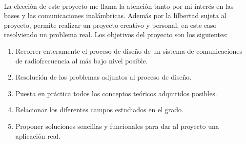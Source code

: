 %
\paragraph{}
La elección de este proyecto me llama la atención tanto por mi interés en las bases y las comunicaciones inalámbricas. 
Además por la lilbertad sujeta al proyecto, permite realizar un proyecto creativo y personal, en este caso resolviendo un problema real.
Los objetivos del proyecto son los siguientes:
\begin{enumerate}
\item Recorrer enteramente el proceso de diseño de un sistema de comunicaciones de radiofrecuencia al más bajo nivel posible.
\item Resolución de los problemas adjuntos al proceso de diseño.
\item Puesta en práctica todos los conceptos teóricos adquiridos posibles.
\item Relacionar los diferentes campos estudiados en el grado.
\item Proponer soluciones sencillas y funcionales para dar al proyecto una aplicaci\'on real.
\end{enumerate}
